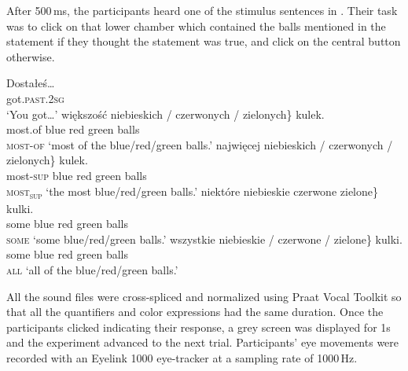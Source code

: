 \documentclass[output=paper]{langscibook}
\begin{document}
After 500\,ms, the participants heard one of the stimulus sentences in . Their task was to click on that lower chamber
which contained the balls mentioned in the statement if they thought the statement was true, and click on the central
button otherwise.



\ea\gll Dostałeś\dots\\
got.\textsc{past.2sg}\\
\glt `You got\dots'\label{tom:ex:dostales}
\ea \gll większość \minsp{\{} niebieskich / czerwonych / zielonych\} kulek.\\
most.of {} blue {} red {} green balls\\\hfill \textsc{most-of}
\glt `most of the blue/red/green balls.'
\ex \gll najwięcej \minsp{\{} niebieskich / czerwonych / zielonych\}
kulek.\\
most\textsc{-sup} {} blue {} red {} green balls\\\hfill \textsc{most\textsubscript{sup}}
\glt `the most blue/red/green balls.'
\ex \gll niektóre \minsp{\{} niebieskie {} czerwone {} zielone\} kulki.\\
some {} blue {} red {} green balls\\\hfill \textsc{some}
\glt `some blue/red/green balls.'
\ex \gll wszystkie \minsp{\{} niebieskie / czerwone / zielone\} kulki.\\
some {} blue {} red {} green balls\\\hfill \textsc{all}
\glt `all of the blue/red/green balls.'
\z
\z

\noindent All the sound files were cross-spliced and normalized using Praat Vocal Toolkit \citep{praatvocaltoolkit} so that all the quantifiers and color expressions had the same duration. Once the participants clicked indicating their response, a grey screen was
displayed for 1s and the experiment advanced to the next trial. Participants’ eye movements were recorded with an
Eyelink 1000 eye-tracker at a sampling rate of 1000\,Hz.
\end{document}
